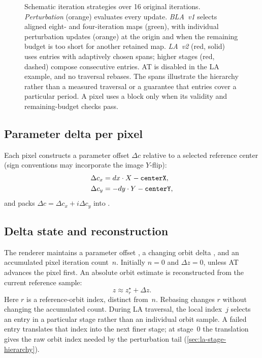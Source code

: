 \begin{figure}[!htbp]
{%
}%
\caption[Iteration skipping: perturbation, BLA~v1, and LA~v2]{%
  \sloppy
  Schematic iteration strategies over 16 original iterations.
  \emph{Perturbation} (orange) evaluates every update.
  \emph{BLA~v1} selects aligned eight- and four-iteration maps (green),
  with individual perturbation updates (orange) at the origin and
  when the remaining budget is too short for another retained map.
  \emph{LA~v2} (red, solid) uses entries with adaptively chosen spans;
  higher stages (red, dashed) compose consecutive entries. AT is
  disabled in the LA example, and no traversal rebases.
  The spans illustrate the hierarchy rather than a measured traversal
  or a guarantee that entries cover a particular period. A pixel uses
  a block only when its validity and remaining-budget checks pass.}
\label{fig:approx-skipping}
\end{figure}

\subsection{Parameter delta per pixel}
Each pixel constructs a parameter offset \(\Delta c\) relative to a selected
reference center (sign conventions may incorporate the image \(Y\)-flip):
\begin{align}
\Delta c_x &= dx\cdot X - \texttt{centerX}, \\
\Delta c_y &= -dy\cdot Y - \texttt{centerY},
\end{align}
and packs \(\Delta c=\Delta c_x+i\Delta c_y\) into .

\subsection{Delta state and reconstruction}
The renderer maintains a parameter offset , a changing
orbit delta , and an accumulated pixel iteration
count~$n$. Initially $n=0$ and $\Delta z=0$, unless AT advances the
pixel first. An absolute orbit estimate is reconstructed from the
current reference sample:
\[
z \approx z_r^\star + \Delta z.
\]
Here $r$ is a reference-orbit index, distinct from~$n$. Rebasing changes
$r$ without changing the accumulated count. During LA traversal, the
local index~$j$ selects an entry in a particular stage rather than an
individual orbit sample. A failed entry translates that index into the
next finer stage; at stage~0 the translation gives the raw orbit index
needed by the perturbation tail (\cref{sec:la-stage-hierarchy}).

